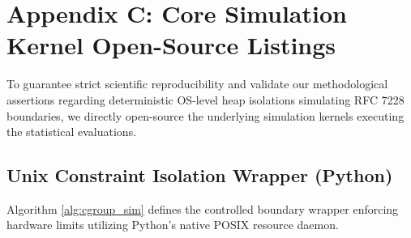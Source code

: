 \section*{Appendix C: Core Simulation Kernel Open-Source Listings}
\label{app:code_snippets}

To guarantee strict scientific reproducibility and validate our methodological assertions regarding deterministic OS-level heap isolations simulating RFC 7228 boundaries, we directly open-source the underlying simulation kernels executing the statistical evaluations.

\subsection{Unix Constraint Isolation Wrapper (Python)}

Algorithm \ref{alg:cgroup_sim} defines the controlled boundary wrapper enforcing hardware limits utilizing Python's native POSIX resource daemon.

